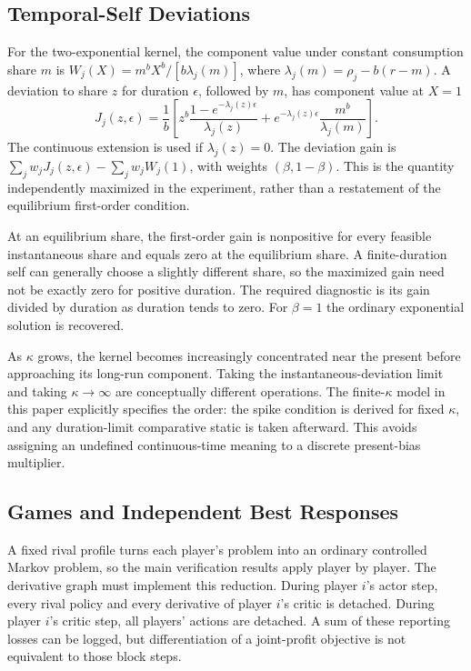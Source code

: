 \documentclass[ecta,nameyear,draft]{econsocart}
\theoremstyle{definition}
\theoremstyle{remark}
\begin{document}
\subsection{Temporal-Self Deviations}
For the two-exponential kernel, the component value under constant consumption share $m$ is $W_j(X)=m^bX^b/[b\lambda_j(m)]$, where $\lambda_j(m)=\rho_j-b(r-m)$. A deviation to share $z$ for duration $\epsilon$, followed by $m$, has component value at $X=1$
\[
 J_j(z,\epsilon)=\frac1b\left[
 z^b\frac{1-e^{-\lambda_j(z)\epsilon}}{\lambda_j(z)}
 +e^{-\lambda_j(z)\epsilon}\frac{m^b}{\lambda_j(m)}\right].
\]
The continuous extension is used if $\lambda_j(z)=0$. The deviation gain is $\sum_jw_jJ_j(z,\epsilon)-\sum_jw_jW_j(1)$, with weights $(\beta,1-\beta)$. This is the quantity independently maximized in the experiment, rather than a restatement of the equilibrium first-order condition.

At an equilibrium share, the first-order gain is nonpositive for every feasible instantaneous share and equals zero at the equilibrium share. A finite-duration self can generally choose a slightly different share, so the maximized gain need not be exactly zero for positive duration. The required diagnostic is its gain divided by duration as duration tends to zero. For $\beta=1$ the ordinary exponential solution is recovered.

As $\kappa$ grows, the kernel becomes increasingly concentrated near the present before approaching its long-run component. Taking the instantaneous-deviation limit and taking $\kappa\to\infty$ are conceptually different operations. The finite-$\kappa$ model in this paper explicitly specifies the order: the spike condition is derived for fixed $\kappa$, and any duration-limit comparative static is taken afterward. This avoids assigning an undefined continuous-time meaning to a discrete present-bias multiplier.

\subsection{Games and Independent Best Responses}
A fixed rival profile turns each player's problem into an ordinary controlled Markov problem, so the main verification results apply player by player. The derivative graph must implement this reduction. During player $i$'s actor step, every rival policy and every derivative of player $i$'s critic is detached. During player $i$'s critic step, all players' actions are detached. A sum of these reporting losses can be logged, but differentiation of a joint-profit objective is not equivalent to those block steps.
\end{document}
